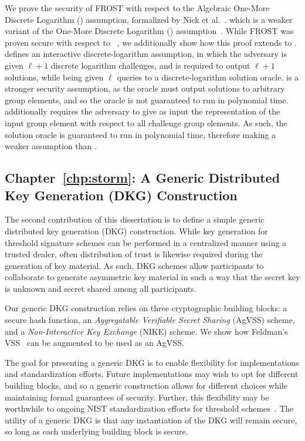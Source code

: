 We prove the security of FROST with respect to the Algebraic One-More Discrete
Logarithm  (\AOMDL) assumption,
formalized by Nick et al.~\cite{NickRS21}.
which is a weaker variant of the One-More Discrete Logarithm (\OMDL) assumption~\cite{BellareNPS03,BauerFP21}.
While FROST was proven secure with respect to \OMDL~\cite{BellareCKMTZ22},
we additionally show how this proof extends to \AOMDL.
\OMDL defines an interactive discrete-logarithm assumption,
in which the adversary is given $\ell+1$ discrete logarithm challenges,
and is required to output $\ell+1$ solutions,
while being given $\ell$ queries to a discrete-logarithm solution oracle.
\OMDL is a stronger security assumption,
as the \OMDL oracle must output solutions to arbitrary group elements,
and so the oracle is not guaranteed to run in polynomial time.
\AOMDL additionally requires the adversary to give as input the representation of the input group element with respect to all challenge group elements.
As such, the \AOMDL solution oracle is guaranteed to run in polynomial time,
therefore making \AOMDL a weaker assumption than \OMDL.

\subsection{Chapter~\ref{chp:storm}: A Generic Distributed Key Generation (DKG) Construction}

The second contribution of this dissertation is to define a simple generic distributed key generation (DKG) construction.
While key generation for threshold signature schemes can be performed in a centralized manner using a trusted dealer,
often distribution of trust is likewise required during the generation of key material.
As such,
DKG schemes allow participants to collaborate to generate asymmetric key material in such a way that the secret key is unknown and secret shared among all participants.

Our generic DKG construction relies on three cryptographic building blocks:
a secure hash function,
an \emph{Aggregatable Verifiable Secret Sharing} (AgVSS) scheme,
and a \emph{Non-Interactive Key Exchange} (NIKE) scheme.
We show how Feldman's VSS~\cite{Feldman87}  can be augmented to be used as an AgVSS.

The goal for presenting a generic DKG is to enable flexibility for implementations and standardization efforts.
Future implementations may wish to opt for different building blocks,
and so a generic construction allows for different choices while maintaining formal guarantees of security.
Further,
this flexibility may be worthwhile to ongoing NIST standardization efforts for threshold schemes~\cite{NIST23}.
The utility of a generic DKG is that any instantiation of the DKG will remain secure,
so long as each underlying building block is secure.

